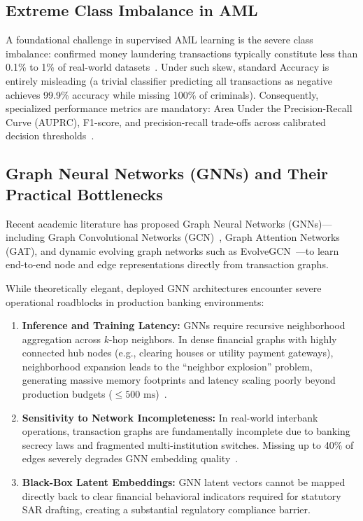 \subsection{Extreme Class Imbalance in AML}
A foundational challenge in supervised AML learning is the severe class imbalance: confirmed money laundering transactions typically constitute less than 0.1\% to 1\% of real-world datasets~\cite{davis2006relationship, jullum2020detecting}. Under such skew, standard Accuracy is entirely misleading (a trivial classifier predicting all transactions as negative achieves 99.9\% accuracy while missing 100\% of criminals). Consequently, specialized performance metrics are mandatory: Area Under the Precision-Recall Curve (AUPRC), F1-score, and precision-recall trade-offs across calibrated decision thresholds~\cite{davis2006relationship}.

\subsection{Graph Neural Networks (GNNs) and Their Practical Bottlenecks}
Recent academic literature has proposed Graph Neural Networks (GNNs)---including Graph Convolutional Networks (GCN)~\cite{weber2019anti}, Graph Attention Networks (GAT), and dynamic evolving graph networks such as EvolveGCN~\cite{pareja2020evolvegcn}---to learn end-to-end node and edge representations directly from transaction graphs. 

While theoretically elegant, deployed GNN architectures encounter severe operational roadblocks in production banking environments:
\begin{enumerate}
    \item \textbf{Inference and Training Latency:} GNNs require recursive neighborhood aggregation across $k$-hop neighbors. In dense financial graphs with highly connected hub nodes (e.g., clearing houses or utility payment gateways), neighborhood expansion leads to the ``neighbor explosion'' problem, generating massive memory footprints and latency scaling poorly beyond production budgets ($\le 500\text{ ms}$)~\cite{yang2021fast}.
    \item \textbf{Sensitivity to Network Incompleteness:} In real-world interbank operations, transaction graphs are fundamentally incomplete due to banking secrecy laws and fragmented multi-institution switches. Missing up to 40\% of edges severely degrades GNN embedding quality~\cite{kim2011network}.
    \item \textbf{Black-Box Latent Embeddings:} GNN latent vectors cannot be mapped directly back to clear financial behavioral indicators required for statutory SAR drafting, creating a substantial regulatory compliance barrier.
\end{enumerate}

